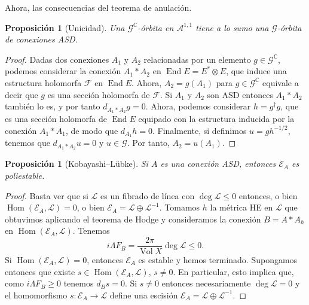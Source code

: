 \documentclass[12pt, a4paper]{amsart}
\newcommand\CC{\mathbb{C}}
\newcommand\Aa{\mathcal{A}}
\newcommand\GG{\mathcal{G}}
\newcommand\FF{\mathscr{F}}
\newcommand\EE{\mathscr{E}}
\newcommand\LL{\mathscr{L}}
\DeclareMathOperator\Vol{Vol}
\DeclareMathOperator\Hom{Hom}
\DeclareMathOperator\End{End}
\newtheorem{prop}[thm]{Proposición}
\theoremstyle{remark} \newtheorem{rmk}[thm]{Observación}
\theoremstyle{remark} \newtheorem{rmks}[thm]{Observaciones}
\theoremstyle{definition} \newtheorem{defn}[thm]{Definición}
\theoremstyle{definition} \newtheorem{ejs}[thm]{Ejemplos}
\theoremstyle{definition} \newtheorem{ej}[thm]{Ejemplo}
\begin{document}
Ahora, las consecuencias del teorema de anulación.
\begin{prop}[Unicidad]
	Una $\GG^\CC$-órbita en $\Aa^{1,1}$ tiene a lo sumo una $\GG$-órbita de conexiones ASD.
\end{prop}
\begin{proof}
	Dadas dos conexiones $A_1$ y $A_2$ relacionadas por un elemento $g\in \GG^\CC$, podemos considerar la conexión $A_1*A_2$ en $\End E=E^* \otimes E$, que induce una estructura holomorfa $\FF$ en $\End E$. Ahora, $A_2=g(A_1)$ para $g\in \GG^\CC$ equivale a decir que $g$ es una sección holomorfa de $\FF$. Si $A_1$ y $A_2$ son ASD entonces $A_1*A_2$ también lo es, y por tanto $d_{A_1*A_2}g=0$. Ahora, podemos considerar $h=g^\dagger g$, que es una sección holomorfa de $\End E$ equipado con la estructura inducida por la conexión $A_1*A_1$, de modo que $d_{A_1}h=0$. Finalmente, si definimos $u=gh^{-1/2}$, tenemos que $d_{A_1*A_2}u=0$ y $u\in \GG$. Por tanto, $A_2=u(A_1)$. 
\end{proof}

\begin{prop}[Kobayashi--Lübke]
	Si $A$ es una conexión ASD, entonces $\EE_A$ es poliestable.
\end{prop}
\begin{proof}
	Basta ver que si $\LL$ es un fibrado de línea con  $\deg \LL \leq 0$ entonces, o bien $\Hom(\EE_A,\LL)=0$, o bien $\EE_A=\LL \oplus \LL^{-1}$. Tomamos $h$ la métrica HE en  $\LL$ que obtuvimos aplicando el teorema de Hodge y consideramos la conexión $B=A*A_h$ en $\Hom(\EE_A,\LL)$. Tenemos
	\begin{equation*}
	i\Lambda F_B = \frac{2\pi}{\Vol X}\deg \LL \leq 0.
	\end{equation*} 
	Si $\Hom(\EE_A,\LL)=0$, entonces $\EE_A$ es estable y hemos terminado. Supongamos entonces que existe $s\in \Hom(\EE_A,\LL)$, $s\neq 0$. En particular, esto implica que, como  $i\Lambda F_B \geq 0$ tenemos $d_B s=0$. Si $s\neq 0$ entonces necesariamente $\deg \LL=0$ y el homomorfismo  $s:\EE_A \rightarrow \LL$ define una escisión  $\EE_A=\LL \oplus \LL^{-1}$.
\end{proof}
\end{document}
